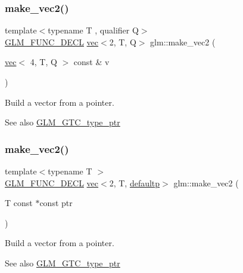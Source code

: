 \subsubsection{\texorpdfstring{make\+\_\+vec2()}{make\_vec2()}\hspace{0.1cm}{\footnotesize\ttfamily [4/5]}}
{\footnotesize\ttfamily template$<$typename T , qualifier Q$>$ \\
\mbox{\hyperlink{setup_8hpp_ab2d052de21a70539923e9bcbf6e83a51}{G\+L\+M\+\_\+\+F\+U\+N\+C\+\_\+\+D\+E\+CL}} \mbox{\hyperlink{structglm_1_1vec}{vec}}$<$2, T, Q$>$ glm\+::make\+\_\+vec2 (\begin{DoxyParamCaption}\item[{\mbox{\hyperlink{structglm_1_1vec}{vec}}$<$ 4, T, Q $>$ const \&}]{v }\end{DoxyParamCaption})\hspace{0.3cm}{\ttfamily [inline]}}

Build a vector from a pointer. \begin{DoxySeeAlso}{See also}
\mbox{\hyperlink{group__gtc__type__ptr}{G\+L\+M\+\_\+\+G\+T\+C\+\_\+type\+\_\+ptr}} 
\end{DoxySeeAlso}
\mbox{\label{group__gtc__type__ptr_ga81253cf7b0ebfbb1e70540c5774e6824}} 
\subsubsection{\texorpdfstring{make\+\_\+vec2()}{make\_vec2()}\hspace{0.1cm}{\footnotesize\ttfamily [5/5]}}
{\footnotesize\ttfamily template$<$typename T $>$ \\
\mbox{\hyperlink{setup_8hpp_ab2d052de21a70539923e9bcbf6e83a51}{G\+L\+M\+\_\+\+F\+U\+N\+C\+\_\+\+D\+E\+CL}} \mbox{\hyperlink{structglm_1_1vec}{vec}}$<$2, T, \mbox{\hyperlink{namespaceglm_a36ed105b07c7746804d7fdc7cc90ff25a9d21ccd8b5a009ec7eb7677befc3bf51}{defaultp}}$>$ glm\+::make\+\_\+vec2 (\begin{DoxyParamCaption}\item[{T const $\ast$const}]{ptr }\end{DoxyParamCaption})}

Build a vector from a pointer. \begin{DoxySeeAlso}{See also}
\mbox{\hyperlink{group__gtc__type__ptr}{G\+L\+M\+\_\+\+G\+T\+C\+\_\+type\+\_\+ptr}} 
\end{DoxySeeAlso}
\mbox{\label{group__gtc__type__ptr_ga9147e4b3a5d0f4772edfbfd179d7ea0b}} 
